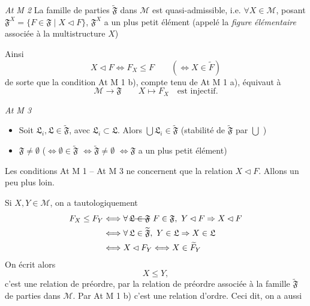 \documentclass[11pt,a4paper]{article}
\begin{document}
\emph{At M 2} La famille de parties $\widetilde{\mathfrak{F}}$ dans
$\mathcal{M}$ est quasi-admissible, i.e. $\forall X \in \mathcal{M}$,
\struck{\ill{}} posant
$\mathfrak{F}^{X} = \{ F \in \mathfrak{F} \mid X \lhd F \}$, $\mathfrak{F}^{X}$
a un plus petit élément (appelé la \emph{figure} \emph{élémentaire} associée à
la multistructure $X$)

Ainsi 
\[
  X \lhd F \Longleftrightarrow F_{X} \leq F \qquad
  (\Longleftrightarrow X \in \widetilde{F})
\]
de sorte que la condition At M 1 b), compte tenu de At M 1 a), équivaut à
\[
  \mathcal{M} \longrightarrow \mathfrak{F} \qquad X \longmapsto F_{X}
  \quad \text{est injectif.}
\]

\emph{At M 3}
\begin{itemize}
  \item[a)] Soit \struck{\ill{}} $\mathfrak{L}_{i}, \mathfrak{L} \in
    \widetilde{\mathfrak{F}}$, avec $\mathfrak{L}_{i} \subset \mathfrak{L}$.
    Alors $\bigcup \mathfrak{L}_{i} \in \widetilde{\mathfrak{F}}$ (stabilité de
    $\widetilde{\mathfrak{F}}$ par $\bigcup$ )
  \item[b)] $\mathfrak{F} \neq \emptyset$
    ($\Longleftrightarrow \emptyset \in \widetilde{\mathfrak{F}}$
    $\Longleftrightarrow \widetilde{\mathfrak{F}} \neq \emptyset$
    $\Longleftrightarrow \mathfrak{F}$ a un plus petit élément)
\end{itemize}

Les conditions At M 1 -- At M 3  ne concernent que
la relation $X \lhd F$. Allons un peu plus loin.
\marginal{$\lhd$ $\leftarrow$}

Si $X, Y \in \mathcal{M}$, on a tautologiquement
\begin{align*}
  F_{X} \leq F_{Y}
  &\Longleftrightarrow \forall\, \text{\struck{$\mathfrak{L} \in \mathfrak{F}$}}\
    F \in \mathfrak{F},\ Y \lhd F \Rightarrow X \lhd F \\
  &\Longleftrightarrow \forall\, \mathfrak{L} \in \widetilde{\mathfrak{F}},\
    Y \in \mathfrak{L} \Rightarrow X \in \mathfrak{L} \\
  &\Longleftrightarrow X \lhd F_{Y} \Longleftrightarrow X \in \widetilde{F}_{Y}
\end{align*}
On écrit alors
\[
  X \leq Y ,
\]
c'est une relation de préordre,  par la relation de
préordre associée à la famille $\widetilde{\mathfrak{F}}$ de parties dans
$\mathcal{M}$. Par At M 1 b) c'est une relation d'ordre. Ceci dit, on a aussi
\marginal{On écrit $\widetilde{X} = \widetilde{F}_{X} = \{ Y \mid Y \lhd F_{X} \}
= \mathcal{M}_{\leq X}$}
\end{document}
